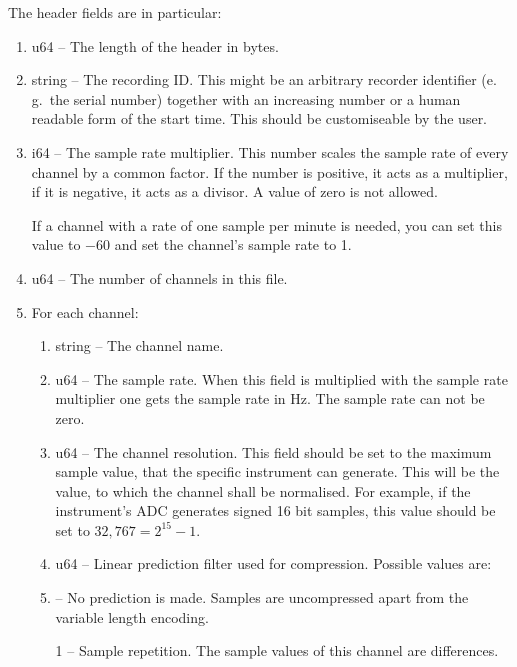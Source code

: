 \documentclass[DIV=10]{scrartcl}
\renewenvironment{quote}
{\list{}{
  \setlength{\rightmargin}{0cm}
  \setlength{\leftmargin}{0.75cm}}%
\item\relax\ignorespaces}
{\unskip\unskip\endlist}
\begin{document}
The header fields are in particular:
\begin{enumerate}
  \item u64 ­­­­– The length of the header in bytes.
  \item string – The recording ID.
  This might be an arbitrary recorder identifier (e.\,g.\ the serial number) together with an increasing number or a human readable form of the start time.
  This should be customiseable by the user.
  \item i64 – The sample rate multiplier.
  This number scales the sample rate of every channel by a common factor.
  If the number is positive, it acts as a multiplier, if it is negative, it acts as a divisor.
  A value of zero is not allowed.

  If a channel with a rate of one sample per minute is needed, you can set this value to \(-60\) and set the channel’s sample rate to 1.
  \item u64 – The number of channels in this file.
  \item For each channel:
  \begin{enumerate}
    \item string – The channel name.
    \item u64 – The sample rate.
    When this field is multiplied with the sample rate multiplier one gets the sample rate in Hz.
    The sample rate can not be zero.
    \item u64 – The channel resolution.
    This field should be set to the maximum sample value, that the specific instrument can generate.
    This will be the value, to which the channel shall be normalised.
    For example, if the instrument’s ADC generates signed 16 bit samples, this value should be set to \(32,767 = 2^{15} - 1\).
    \item u64 – Linear prediction filter used for compression.
    Possible values are:
    \begin{quote}
      0 – No prediction is made. Samples are uncompressed apart from the variable length encoding.

      1 – Sample repetition. The sample values of this channel are differences.


\end{quote}
\end{enumerate}
\end{enumerate}
\end{document}
